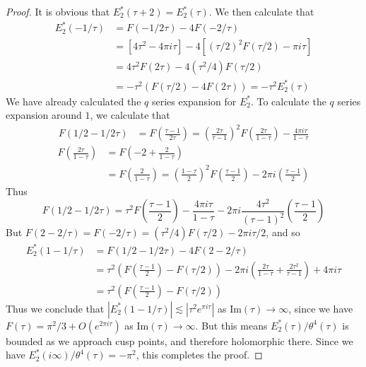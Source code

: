 \documentclass{article}
\theoremstyle{plain}
\theoremstyle{remark}
\theoremstyle{definition}
\begin{document}
\begin{proof}
It is obvious that $E_2^*(\tau + 2) = E_2^*(\tau)$. We then calculate that
%
\begin{align*}
    E_2^*(-1/\tau) &= F(-1/2\tau) - 4F(-2/\tau)\\
    &= [4\tau^2 - 4 \pi i \tau] - 4[(\tau/2)^2 F(\tau/2) - \pi i \tau]\\
    &= 4 \tau^2 F(2 \tau) - 4(\tau^2/4) F(\tau/2)\\
    &= - \tau^2(F(\tau/2) - 4F(2\tau)) = - \tau^2 E_2^*(\tau)
\end{align*}
%
We have already calculated the $q$ series expansion for $E_2^*$. To calculate the $q$ series expansion around $1$, we calculate that
%
\begin{align*}
    F(1/2 - 1/2\tau) &= F \left( \frac{\tau - 1}{2 \tau} \right) = \left( \frac{2 \tau}{\tau - 1} \right)^2 F \left( \frac{2 \tau}{1 - \tau} \right) - \frac{4 \pi i \tau}{1 - \tau}
\end{align*}
%
\begin{align*}
    F \left( \frac{2\tau}{1 - \tau} \right) &= F \left(-2 + \frac{2}{1 - \tau} \right)\\
    &= F \left( \frac{2}{1 - \tau} \right) = \left( \frac{1 - \tau}{2} \right)^2 F \left( \frac{\tau - 1}{2} \right) - 2 \pi i \left( \frac{\tau - 1}{2} \right)
\end{align*}
%
Thus
%
\[ F(1/2 - 1/2\tau) = \tau^2 F \left( \frac{\tau - 1}{2} \right) - \frac{4 \pi i \tau}{1 - \tau} - 2 \pi i \frac{4 \tau^2}{(\tau - 1)^2} \left( \frac{\tau - 1}{2} \right) \]
%
But $F(2 - 2/\tau) = F(-2/\tau) = (\tau^2/4) F(\tau/2) - 2 \pi i \tau/2$, and so
%
\begin{align*}
    E_2^*(1 - 1/\tau) &= F(1/2 - 1/2\tau) - 4 F(2 - 2/\tau)\\
    &= \tau^2 \left( F\left( \frac{\tau - 1}{2} \right) - F(\tau/2) \right) - 2 \pi i \left( \frac{2 \tau}{1 - \tau} + \frac{2 \tau^2}{\tau - 1} \right) + 4 \pi i \tau\\
    &= \tau^2 \left( F \left( \frac{\tau - 1}{2} \right) - F(\tau/2) \right)
\end{align*}
%
Thus we conclude that $|E_2^*(1 - 1/\tau)| \lesssim |\tau^2 e^{\pi i \tau}|$ as $\text{Im}(\tau) \to \infty$, since we have $F(\tau) = \pi^2/3 + O(e^{2 \pi i \tau})$ as $\text{Im}(\tau) \to \infty$. But this means $E_2^*(\tau)/\theta^4(\tau)$ is bounded as we approach cusp points, and therefore holomorphic there. Since we have $E_2^*(i \infty)/\theta^4(\tau) = -\pi^2$, this completes the proof.
\end{proof}
\end{document}
